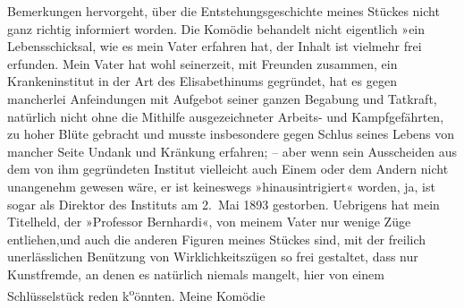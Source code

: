 \begin{ledgroupsized}[t]{13cm}
               Bemerkungen hervorgeht, über die Entstehungsgeschichte meines Stückes nicht ganz
               richtig informiert worden. Die Komödie behandelt nicht eigentlich »ein Lebensschicksal, wie es mein Vater
               erfahren hat, der Inhalt ist vielmehr frei erfunden. Mein {\pb}Vater hat wohl seinerzeit,
               mit Freunden zusammen, ein Krankeninstitut in der Art des Elisabethinums gegründet, hat es gegen
               mancherlei Anfeindungen mit Aufgebot seiner ganzen Begabung und Tatkraft, natürlich
               nicht ohne die Mithilfe ausgezeichneter Arbeits- und Kampfgefährten, zu hoher Blüte
               gebracht und musste insbesondere gegen Schlus seines Lebens von mancher Seite Undank
               und Kränkung erfahren; – aber wenn sein Ausscheiden aus dem von ihm gegründeten
               Institut vielleicht auch Einem oder dem Andern nicht unangenehm gewesen wäre, er ist
               keineswegs »hinausintrigiert« worden, ja,  ist
               sogar als Direktor des Instituts
               am 2. Mai 1893 gestorben. Uebrigens hat mein Titelheld, der »Professor Bernhardi«, von
               meinem Vater nur wenige Züge
               entliehen,und auch die anderen Figuren meines Stückes sind, mit der freilich
               unerlässlichen Benützung von Wirklichkeitszügen so frei gestaltet, dass nur
               Kunstfremde, an denen es natürlich {\pb}niemals
               mangelt, hier von einem Schlüsselstück reden k\substVorne{}\textsuperscript{o}\substDazwischen{}ö\substHinten{}nnten. Meine Komödie

\end{ledgroupsized}
